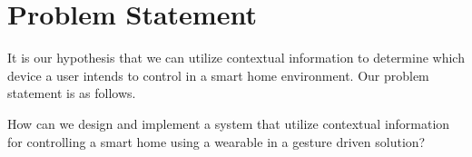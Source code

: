 \section{Problem Statement}
\label{sec:problem-statement}

It is our hypothesis that we can utilize contextual information to determine which device a user intends to control in a smart home environment. Our problem statement is as follows.

\begin{framed}
\noindent How can we design and implement a system that utilize contextual information for controlling a smart home using a wearable in a gesture driven solution?
\end{framed}

